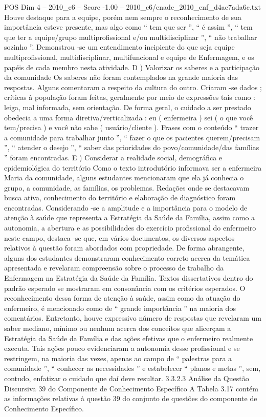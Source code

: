\begin{textsample}{POS Dim 4 – 2010\_c6 – Score -1.00 – 2010\_c6/enade\_2010\_enf\_d4ae7ada6c.txt}
Houve destaque para a equipe, porém nem sempre o reconhecimento de sua importância esteve presente, mas algo como “ tem que ser ”, “ é assim ”, “ tem que ter a equipe/grupo multiprofissional e/ou multidisciplinar ”, “ não trabalhar sozinho ”.
Demonstrou -se um entendimento incipiente do que seja equipe multiprofissional, multidisciplinar, multifuncional e equipe de Enfermagem, e os papéis de cada membro nesta atividade.
D ) Valorizar os saberes e a participação da comunidade Os saberes não foram contemplados na grande maioria das respostas.
Alguns comentaram a respeito da cultura do outro.
Criaram -se dados ; críticas à população foram feitas, geralmente por meio de expressões tais como : leiga, mal informada, sem orientação.
De forma geral, o cuidado a ser prestado obedecia a uma forma diretiva/verticalizada : eu ( enfermeira ) sei ( o que você tem/precisa ) e você não sabe ( usuário/cliente ).
Frases com o conteúdo “ trazer a comunidade para trabalhar junto ”, “ fazer o que os pacientes querem/precisam ”, “ atender o desejo ”, “ saber das prioridades do povo/comunidade/das famílias ” foram encontradas.
E ) Considerar a realidade social, demográfica e epidemiológica do território Como o texto introdutório informava ser a enfermeira Maria da comunidade, alguns estudantes mencionaram que ela já conhecia o grupo, a comunidade, as famílias, os problemas.
Redações onde se destacavam busca ativa, conhecimento do território e elaboração de diagnóstico foram encontradas.
Considerando -se a amplitude e a importância para o modelo de atenção à saúde que representa a Estratégia da Saúde da Família, assim como a autonomia, a abertura e as possibilidades do exercício profissional do enfermeiro neste campo, destaca -se que, em vários documentos, os diversos aspectos relativos à questão foram abordados com propriedade.
De forma abrangente, alguns dos estudantes demonstraram conhecimento correto acerca da temática apresentada e revelaram compreensão sobre o processo de trabalho da Enfermagem na Estratégia da Saúde da Família.
Textos dissertativos dentro do padrão esperado se mostraram em consonância com os critérios esperados.
O reconhecimento dessa forma de atenção à saúde, assim como da atuação do enfermeiro, é mencionado como de “ grande importância ” na maioria dos comentários.
Entretanto, houve expressivo número de respostas que revelaram um saber mediano, mínimo ou nenhum acerca dos conceitos que alicerçam a Estratégia da Saúde da Família e das ações efetivas que o enfermeiro realmente executa.
Tais ações pouco evidenciaram a autonomia desse profissional e se restringem, na maioria das vezes, apenas ao campo de “ palestras para a comunidade ”, “ conhecer as necessidades ” e estabelecer “ planos e metas ”, sem, contudo, enfatizar o cuidado que daí deve resultar. 3.3.2.3 Análise da Questão Discursiva 39 do Componente de Conhecimento Específico A Tabela 3.17 contém as informações relativas à questão 39 do conjunto de questões do componente de Conhecimento Específico.

\end{textsample}
